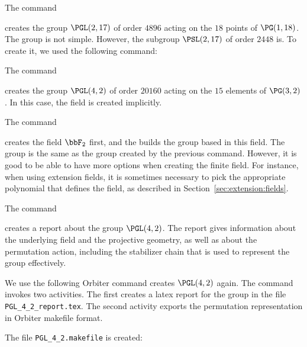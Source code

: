 \bigskip

The command 


creates the group $\PGL(2,17)$ of order $4896$ acting on the $18$ points of $\PG(1,18)$. 
The group is not simple. 
However, the subgroup $\PSL(2,17)$ of order $2448$ is. 
To create it, we used the following command:


\bigskip

The command 


creates the group $\PGL(4,2)$ of order $20160$ acting on the $15$ elements of $\PG(3,2)$. 
In this case, the field is created implicitly.



\bigskip


The command 


creates the field $\bbF_2$ first, and the builds the group based in this field. 
The group is the same as the group created by the previous command.
However, it is good to be able to have more options when creating the finite field. 
For instance, when using extension fields, it is sometimes necessary to pick the appropriate polynomial 
that defines the field, as described in Section~\ref{sec:extension:fields}.


\bigskip

The command 


creates a report about the group $\PGL(4,2)$.
The report gives information about the underlying field and the projective geometry, 
as well as about the permutation action, 
including the stabilizer chain that is used to represent the group effectively.




\bigskip


We use the following Orbiter command creates $\PGL(4,2)$ again.
The command invokes two activities. 
The first creates a latex report for the group in the file \verb'PGL_4_2_report.tex'.
The second activity exports the permutation representation in Orbiter makefile format.


The file \verb'PGL_4_2.makefile' is created:

